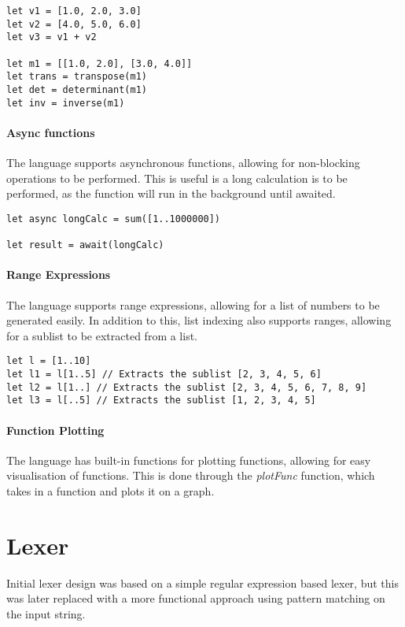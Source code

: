 \begin{verbatim}
let v1 = [1.0, 2.0, 3.0]
let v2 = [4.0, 5.0, 6.0]
let v3 = v1 + v2

let m1 = [[1.0, 2.0], [3.0, 4.0]]
let trans = transpose(m1)
let det = determinant(m1)
let inv = inverse(m1)
\end{verbatim}


\paragraph{Async functions} The language supports asynchronous functions, allowing for non-blocking operations
to be performed.
This is useful is a long calculation is to be performed, as the function will run in the background until awaited.

\begin{verbatim}
let async longCalc = sum([1..1000000])

let result = await(longCalc)
\end{verbatim}

\paragraph{Range Expressions} The language supports range expressions, allowing for a list of numbers to be
generated easily.
In addition to this, list indexing also supports ranges, allowing for a sublist to be extracted from a list.

\begin{verbatim}
let l = [1..10]
let l1 = l[1..5] // Extracts the sublist [2, 3, 4, 5, 6]
let l2 = l[1..] // Extracts the sublist [2, 3, 4, 5, 6, 7, 8, 9]
let l3 = l[..5] // Extracts the sublist [1, 2, 3, 4, 5]
\end{verbatim}

\paragraph{Function Plotting} The language has built-in functions for plotting functions, allowing for easy
visualisation of functions.
This is done through the \textit{plotFunc} function, which takes in a function and plots it on a graph.

\section{Lexer}\label{sec:lexer}

Initial lexer design was based on a simple regular expression based lexer, but this was later replaced with a more
functional approach using pattern matching on the input string.

